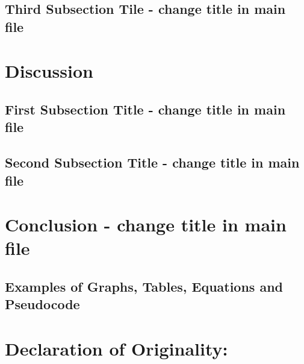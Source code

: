 \documentclass[12pt]{article}
\begin{document}
\begin{spacing}{1.5}
\subsection{Third Subsection Tile - change title in main file}


\newpage
\bigskip

\section{Discussion}

\subsection{First Subsection Title - change title in main file}

\subsection{Second Subsection Title - change title in main file}


\newpage


\section{Conclusion - change title in main file}



\subsection{Examples of Graphs, Tables, Equations and Pseudocode}



\newpage
{}



\newpage
\thispagestyle{empty}
\section*{Declaration of Originality:}


\end{spacing}
\end{document}
